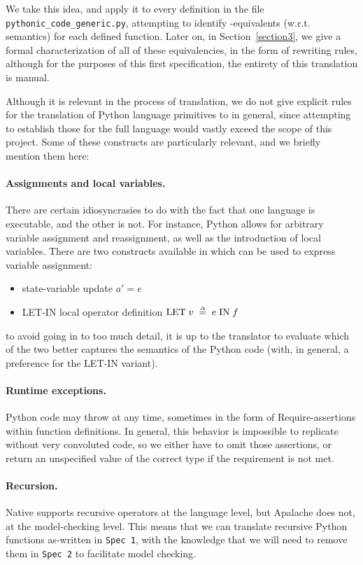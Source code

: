 We take this idea, and apply it to every definition in the file \texttt{pythonic\_code\_generic.py}, attempting to identify \tlap{}-equivalents (w.r.t. semantics) for each defined function. 
Later on, in Section~\ref{section3}, we give a formal characterization of all of these equivalencies, in the form of rewriting rules, although for the purposes of this first specification, the entirety of this translation is manual.

Although it is relevant in the process of translation, we do not give explicit rules for the translation of Python language primitives to \tlap{} in general, since attempting to establish those for the full language would vastly exceed the scope of this project. 
Some of these constructs are particularly relevant, and we briefly mention them here:
\paragraph{Assignments and local variables.} There are certain idiosyncrasies to do with the fact that one language is executable, and the other is not. For instance, Python allows for arbitrary variable assignment and reassignment, as well as the introduction of local variables. There are two constructs available in \tlap{} which can be used to express variable assignment:
\begin{itemize}
  \item state-variable update $a' = e$
  \item LET-IN local operator definition $\mathrm{LET}\; v \;\mathrel{\smash {{\stackrel{\scriptscriptstyle\Delta}{=}}}}\; e \;\mathrm{IN}\; f$
\end{itemize}
to avoid going in to too much detail, it is up to the translator to evaluate which of the two better captures the semantics of the Python code (with, in general, a preference for the LET-IN variant).
\paragraph{Runtime exceptions.} Python code may throw at any time, sometimes in the form of Require-assertions within function definitions. 
In general, this behavior is impossible to replicate without very convoluted \tlap{} code, so we either have to omit those assertions, or return an unspecified value of the correct type if the requirement is not met.

\paragraph{Recursion.} Native \tlap{} supports recursive operators at the language level, but Apalache does not, at the model-checking level. This means that we can translate recursive Python functions as-written in \texttt{Spec 1}, with the knowledge that we will need to remove them in \texttt{Spec 2} to facilitate model checking.


